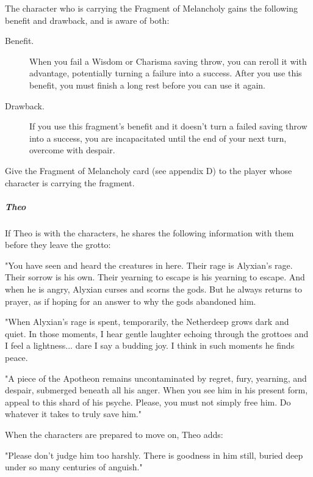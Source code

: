 \documentclass[10pt,a4paper,twoside,fancy,bg=print,twocolumn,openany,nodeprecatedcode]{dndbook}
\begin{document}
The character who is carrying the Fragment of Melancholy gains the following benefit and drawback, and is aware of both:



\begin{description}
\item[Benefit.]
When you fail a Wisdom or Charisma saving throw, you can reroll it with advantage, potentially turning a failure into a success. After you use this benefit, you must finish a long rest before you can use it again.
\item[Drawback.]
If you use this fragment's benefit and it doesn't turn a failed saving throw into a success, you are incapacitated until the end of your next turn, overcome with despair.
\end{description}





Give the Fragment of Melancholy card (see appendix D) to the player whose character is carrying the fragment.

\subparagraph{Theo}
If Theo is with the characters, he shares the following information with them before they leave the grotto:

\begin{DndReadAloud}{}
"You have seen and heard the creatures in here. Their rage is Alyxian's rage. Their sorrow is his own. Their yearning to escape is his yearning to escape. And when he is angry, Alyxian curses and scorns the gods. But he always returns to prayer, as if hoping for an answer to why the gods abandoned him.

"When Alyxian's rage is spent, temporarily, the Netherdeep grows dark and quiet. In those moments, I hear gentle laughter echoing through the grottoes and I feel a lightness... dare I say a budding joy. I think in such moments he finds peace.

"A piece of the Apotheon remains uncontaminated by regret, fury, yearning, and despair, submerged beneath all his anger. When you see him in his present form, appeal to this shard of his psyche. Please, you must not simply free him. Do whatever it takes to truly save him."

\end{DndReadAloud}

When the characters are prepared to move on, Theo adds:

\begin{DndReadAloud}{}
"Please don't judge him too harshly. There is goodness in him still, buried deep under so many centuries of anguish."

\end{DndReadAloud}
\end{document}
